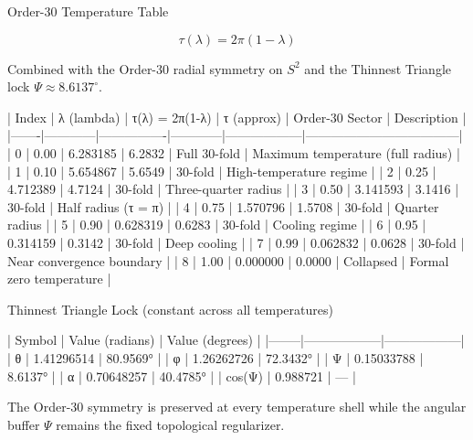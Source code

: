Order-30 Temperature Table

\[
\tau(\lambda)=2\pi(1-\lambda)
\]

Combined with the Order-30 radial symmetry on \(S^2\) and the Thinnest Triangle lock \(\Psi\approx 8.6137^\circ\).

| Index | λ (lambda) | τ(λ) = 2π(1-λ) | τ (approx) | Order-30 Sector | Description                        |
|-------|------------|----------------|------------|------------------|------------------------------------|
| 0     | 0.00       | 6.283185       | 6.2832     | Full 30-fold     | Maximum temperature (full radius)  |
| 1     | 0.10       | 5.654867       | 5.6549     | 30-fold          | High-temperature regime            |
| 2     | 0.25       | 4.712389       | 4.7124     | 30-fold          | Three-quarter radius               |
| 3     | 0.50       | 3.141593       | 3.1416     | 30-fold          | Half radius (τ = π)                |
| 4     | 0.75       | 1.570796       | 1.5708     | 30-fold          | Quarter radius                     |
| 5     | 0.90       | 0.628319       | 0.6283     | 30-fold          | Cooling regime                     |
| 6     | 0.95       | 0.314159       | 0.3142     | 30-fold          | Deep cooling                       |
| 7     | 0.99       | 0.062832       | 0.0628     | 30-fold          | Near convergence boundary          |
| 8     | 1.00       | 0.000000       | 0.0000     | Collapsed        | Formal zero temperature            |

Thinnest Triangle Lock (constant across all temperatures)

| Symbol | Value (radians) | Value (degrees) |
|--------|------------------|------------------|
| θ      | 1.41296514       | 80.9569°         |
| φ      | 1.26262726       | 72.3432°         |
| Ψ  | 0.15033788   | 8.6137°      |
| α      | 0.70648257       | 40.4785°         |
| cos(Ψ) | 0.988721         | —                |

The Order-30 symmetry is preserved at every temperature shell while the angular buffer \(\Psi\) remains the fixed topological regularizer.
